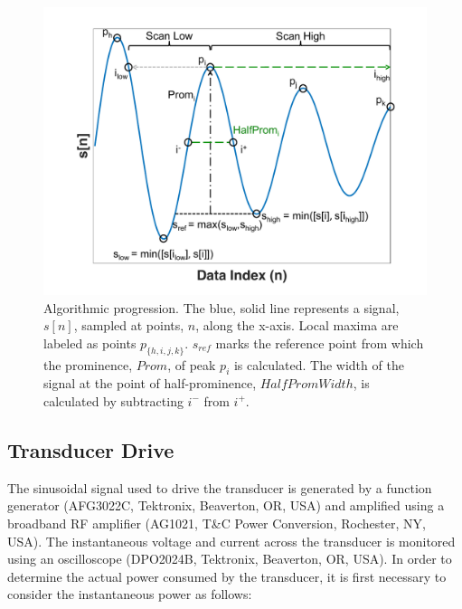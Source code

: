\begin{figure}[htb]
  \begin{minipage}[t]{0.99\linewidth}\centering
	\includegraphics[width=12cm]{alg}
  \end{minipage}\hfill
  \caption[Algorithmic progression for calculating prominence]{Algorithmic progression. The blue, solid line represents a signal, $s[n]$, sampled at points, $n$, along the x-axis. Local maxima are labeled as points $p_{\{h,i,j,k\}}$. $s_{ref}$ marks the reference point from which the prominence, $Prom$, of peak $p_i$ is calculated. The width of the signal at the point of half-prominence, $HalfPromWidth$, is calculated by subtracting $i^-$ from $i^+$.}
	\label{fig:algProg}
\end{figure}

\subsection{Transducer Drive}
\label{ssec:MoM}



The sinusoidal signal used to drive the transducer is generated by a function generator (AFG3022C, Tektronix, Beaverton, OR, USA) and amplified using a broadband RF amplifier (AG1021, T\&C Power Conversion, Rochester, NY, USA). The instantaneous voltage and current across the transducer is monitored using an oscilloscope (DPO2024B, Tektronix, Beaverton, OR, USA). In order to determine the actual power consumed by the transducer, it is first necessary to consider the instantaneous power as follows:

